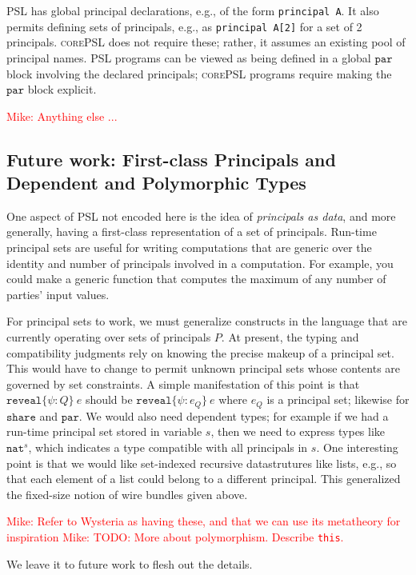 \documentclass[10pt]{article}
\newcommand{\kw}[1]{\ensuremath{\mathtt{#1}}}
\newcommand{\tnat}{\ensuremath{\mathtt{nat}}}
\newcommand{\ereveal}[3]{\ensuremath{\kw{reveal}\{{#1}\!:\!{#2}\}~{#3}}}
\newcommand{\lang}{\textsc{corePSL}\xspace}
\newcommand{\mwh}[1]{\textcolor{red}{Mike: #1}}
\begin{document}
PSL has global principal declarations, e.g., of the form
\texttt{principal A}. It also permits defining sets of principals,
e.g., as \texttt{principal A[2]} for a set of 2 principals. \lang does
not require these; rather, it assumes an existing pool of principal
names. PSL programs can be viewed as being defined in a global
$\kw{par}$ block involving the declared principals; \lang programs
require making the $\kw{par}$ block explicit.

\mwh{Anything else ...}

\subsection{Future work: First-class Principals and Dependent and
  Polymorphic Types}
\label{sec:deptypes}

One aspect of PSL not encoded here is the idea of
\emph{principals as data}, and more generally, having a first-class
representation of a set of principals. Run-time principal sets are
useful for writing computations that are generic over the identity and
number of principals involved in a computation. For example, you could
make a generic function that computes the maximum of any number of
parties' input values.

For principal sets to work, we must generalize constructs in the
language that are currently operating over sets of principals $P$. At
present, the typing and compatibility judgments rely on knowing the
precise makeup of a principal set. This would have to change to permit
unknown principal sets whose contents are governed by set
constraints. A simple manifestation of this point is that
$\ereveal{\psi}{Q}{e}$ should be $\ereveal{\psi}{e_Q}{e}$
where $e_Q$ is a principal set; likewise for $\kw{share}$
and $\kw{par}$. We would also need dependent types; for example if we
had a run-time principal set stored in variable $s$, then we need to
express types like $\tnat^s$, which indicates a type compatible with
all principals in $s$. One interesting point is that we would like
set-indexed recursive datastrutures like lists, e.g., so that each
element of a list could belong to a different principal. This
generalized the fixed-size notion of wire bundles given above.

\mwh{Refer to Wysteria as having these, and that we can use its
  metatheory for inspiration}
\mwh{TODO: More about polymorphism. Describe \texttt{this}.}

We leave it to future work to flesh out the details. 
\end{document}
